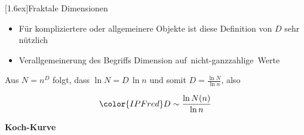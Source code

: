\documentclass[final]{beamer}
\newlength{\columnheight}
\newlength{\marginw}
\newlength{\tw}
\newlength{\colw}
\newenvironment{myTwoColPoster}{%
  \begin{minipage}[t]{\textwidth}%
    \hspace*{\marginw}%
    \hspace*{9.5bp}%
    \begin{minipage}[t]{\tw}}%
  {\end{minipage}%
   \hspace*{\marginw}%
   \end{minipage}}
\newenvironment{myCol}%
    {\begin{minipage}[t][\columnheight][t]{\colw}}%
    {\end{minipage}}
\newenvironment{textblock}[1]%
    {\begin{block}{\rule[-0.6ex]{0pt}{2.4ex}\raisebox{-0.25ex}[1.6ex]{#1}}%
     \vspace*{5mm}}%
    {\vspace*{5mm}\end{block}}
\begin{document}
\begin{frame}[t]{}
\begin{myTwoColPoster}
\begin{myCol}

  \begin{textblock}{Fraktale Dimensionen}
  \begin{itemize}
    \item F\"ur kompliziertere oder allgemeinere Objekte ist diese Definition von $D$ sehr n\"utzlich
    \item Verallgemeinerung des Begriffs Dimension auf\,  \textcolor{IPFred}{nicht-ganzzahlige} \,Werte
  \end{itemize}
  \centerline{Aus   \textcolor{IPFred}{$N=n^D$}  folgt, dass   \textcolor{IPFred}{$\ln N=D\,\ln n$}  und somit   \textcolor{IPFred}{$D=\frac{\ln N} {\ln n}$}, also}\vspace*{-0.3cm}
    {\large
      \begin{align*}
        \color{IPFred} D \sim \frac{\ln N(n)} {\ln n}
      \end{align*}
    }
  \begin{minipage}[c]{0.22\textwidth}
    \centerline{ \textbf{ Koch-Kurve}}\vspace*{2.5cm}

\end{minipage}
\end{textblock}
\end{myCol}
\end{myTwoColPoster}
\end{frame}
\end{document}
